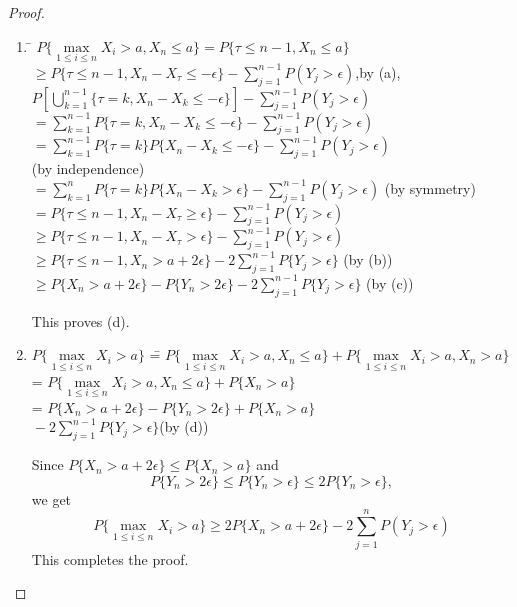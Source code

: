 \begin{proof}
\begin{enumerate}
\item \begin{tabbing}
\= $P\{\max\limits_{1\leq i\leq n}X_{i}>a,X_{n}\leq a\}=P\{\tau\leq
  n-1,X_{n}\leq a\}$\\[4pt]
\> $\geq P\{\tau\leq n-1,X_{n}-X_{\tau}\leq
-\epsilon\}-\sum\limits^{n-1}_{j=1}P(Y_{j}>\epsilon)$,\q by
(a),\\[4pt]
\> $P\left[\bigcup\limits^{n-1}_{k=1}\{\tau=k,X_{n}-X_{k}\leq
  -\epsilon\}\right]-\sum\limits^{n-1}_{j=1}P(Y_{j}>\epsilon)$\\[4pt]
\> $=\sum\limits^{n-1}_{k=1}P\{\tau=k,X_{n}-X_{k}\leq
-\epsilon\}-\sum\limits^{n-1}_{j=1}P(Y_{j}>\epsilon)$\\[4pt]
\> $=\sum\limits^{n-1}_{k=1}P\{\tau=k\}P\{X_{n}-X_{k}\leq
-\epsilon\}-\sum\limits^{n-1}_{j=1}P(Y_{j}>\epsilon)$\\[4pt]
\>\hspace{4cm} (by independence)\\[4pt]
\>
$=\sum\limits^{n}_{k=1}P\{\tau=k\}P\{X_{n}-X_{k}>\epsilon\}-\sum\limits^{n-1}_{j=1}P(Y_{j}>\epsilon)$\q
(by symmetry)\\[4pt]
\> $=P\{\tau\leq n-1,X_{n}-X_{\tau}\geq
\epsilon\}-\sum\limits^{n-1}_{j=1}P(Y_{j}>\epsilon)$\\[4pt]
\> $ \geq P\{\tau\leq
n-1,X_{n}-X_{\tau}>\epsilon\}-\sum\limits^{n-1}_{j=1}P(Y_{j}>\epsilon)$\\[4pt]
\> $\geq P\{\tau\leq
n-1,X_{n}>a+2\epsilon\}-2\sum\limits^{n-1}_{j=1}P\{Y_{j}>\epsilon\}$\q
(by (b))\\[4pt]
\> $\geq
P\{X_{n}>a+2\epsilon\}-P\{Y_{n}>2\epsilon\}-2\sum\limits^{n-1}_{j=1}P\{Y_{j}>\epsilon\}$\q
(by (c))
\end{tabbing}\pageoriginale

This proves (d).

\item \begin{tabbing}
$P\{\max\limits_{1\leq i\leq n}X_{i}>a\}$ \==
  $P\{\max\limits_{1\leq i\leq n}X_{i}>a,X_{n}\leq
  a\}+P\{\max\limits_{1\leq i\leq n}X_{i}>a,X_{n}>a\}$\\[4pt]
\>= $P\{\max\limits_{1\leq i\leq n}X_{i}>a,X_{n}\leq
a\}+P\{X_{n}>a\}$\\[4pt]
\>= $P\{X_{n}>a+2\epsilon\}-P\{Y_{n}>2\epsilon\}+P\{X_{n}>a\}$\\[4pt]
\>\hspace{2.6cm} ${}-2\sum\limits^{n-1}_{j=1}P\{Y_{j}>\epsilon\}$\q (by
(d))
\end{tabbing}

Since $P\{X_{n}>a+2\epsilon\}\leq P\{X_{n}>a\}$ and 
$$
P\{Y_{n}>2\epsilon\}\leq P\{Y_{n}>\epsilon\}\leq 2P\{Y_{n}>\epsilon\},
$$
we get
$$
P\{\max\limits_{1\leq i\leq n} X_{i}>a\}\geq
2P\{X_{n}>a+2\epsilon\}-2\sum\limits^{n}_{j=1}P(Y_{j}>\epsilon)
$$\pageoriginale 
This completes the proof.
\end{enumerate}
\end{proof}

